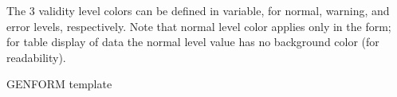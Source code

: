 The 3 validity level colors can be defined in  variable, for normal, warning, and error levels, respectively. Note that normal level color applies only in the form; for table display of data the normal level value has no background color (for readability).




\begin{table}[htp]
\caption{GENFORM template}
\label{genform_template}

\end{table}


